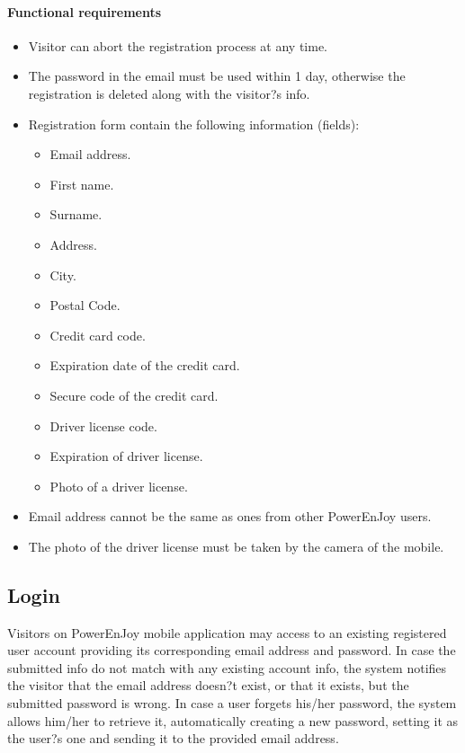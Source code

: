 \paragraph{Functional requirements }
\begin{itemize}
	\item Visitor can abort the registration process at any time.
	\item The password in the email must be used within 1 day, otherwise the registration is deleted along with the visitor?s info.
	\item Registration form contain the following information (fields):
	\begin{itemize}
		\item Email address.
		\item First name.
		\item Surname.
		\item Address.
		\item City.
		\item Postal Code.
		\item Credit card code.
		\item Expiration date of the credit card.
		\item Secure code of the credit card.
		\item Driver license code.
		\item Expiration of driver license.
		\item Photo of a driver license.
	\end{itemize}
	\item Email address cannot be the same as ones from other PowerEnJoy users.
	\item The photo of the driver license must be taken by the camera of the mobile.
\end{itemize}

\subsection{Login}
Visitors on PowerEnJoy mobile application may access to an existing registered user account providing its corresponding email address and password. In case the submitted info do not match with any existing account info, the system notifies the visitor that the email address doesn?t exist, or that it exists, but the submitted password is wrong. In case a user forgets his/her password, the system allows him/her to retrieve it, automatically creating a new password, setting it as the user?s one and sending it to the provided email address.
